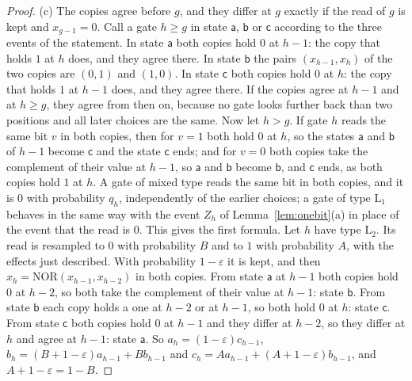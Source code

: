 \documentclass[11pt]{amsart}
\theoremstyle{definition}
\theoremstyle{remark}
\newcommand{\eps}{\varepsilon}
\newcommand{\NOR}{\mathrm{NOR}}
\begin{document}
\begin{proof}
(c) The copies agree before $g$, and they differ at $g$ exactly if the read of $g$ is kept and
$x_{g-1}=0$. Call a gate $h\ge g$ in state $\mathsf a$, $\mathsf b$ or $\mathsf c$ according to
the three events of the statement. In state $\mathsf a$ both copies hold $0$ at $h-1$: the copy
that holds $1$ at $h$ does, and they agree there. In state $\mathsf b$ the pairs
$(x_{h-1},x_h)$ of the two copies are $(0,1)$ and $(1,0)$. In state $\mathsf c$ both copies hold
$0$ at $h$: the copy that holds $1$ at $h-1$ does, and they agree there. If the copies agree at
$h-1$ and at $h\ge g$, they agree from then on, because no gate looks further back than two
positions and all later choices are the same. Now let $h>g$. If gate $h$ reads the same bit $v$
in both copies, then for $v=1$ both hold $0$ at $h$, so the states $\mathsf a$ and $\mathsf b$ of
$h-1$ become $\mathsf c$ and the state $\mathsf c$ ends; and for $v=0$ both copies take the
complement of their value at $h-1$, so $\mathsf a$ and $\mathsf b$ become $\mathsf b$, and
$\mathsf c$ ends, as both copies hold $1$ at $h$. A gate of mixed type reads the same bit in
both copies, and it is $0$ with probability $q_h$, independently of the earlier choices; a gate
of type $\mathrm L_1$ behaves in the same way with the event $Z_h$ of
Lemma~\ref{lem:onebit}(a) in place of the event that the read is $0$. This gives the first
formula. Let $h$ have type $\mathrm L_2$. Its read is resampled to $0$ with probability $B$ and
to $1$ with probability $A$, with the effects just described. With probability $1-\eps$ it is
kept, and then $x_h=\NOR(x_{h-1},x_{h-2})$ in both copies. From state $\mathsf a$ at $h-1$ both
copies hold $0$ at $h-2$, so both take the complement of their value at $h-1$: state
$\mathsf b$. From state $\mathsf b$ each copy holds a one at $h-2$ or at $h-1$, so both hold $0$
at $h$: state $\mathsf c$. From state $\mathsf c$ both copies hold $0$ at $h-1$ and they differ
at $h-2$, so they differ at $h$ and agree at $h-1$: state $\mathsf a$. So
$a_h=(1-\eps)c_{h-1}$, $b_h=(B+1-\eps)a_{h-1}+Bb_{h-1}$ and
$c_h=Aa_{h-1}+(A+1-\eps)b_{h-1}$, and $A+1-\eps=1-B$.
\end{proof}
\end{document}
